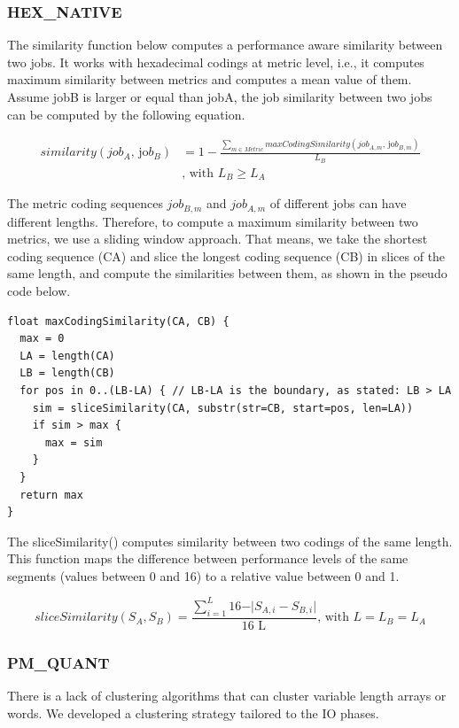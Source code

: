 \documentclass[]{llncs}
\begin{document}
\subsubsection{HEX\_NATIVE}
The similarity function below computes a performance aware similarity between two jobs.
It works with hexadecimal codings at metric level, i.e., it computes maximum similarity between metrics and computes a mean value of them.
Assume jobB is larger or equal than jobA, the job similarity between two jobs can be computed by the following equation.

\begin{align}
similarity \left( job_{A}\text{, jo}b_{B} \right) &= 1-\frac{ \sum _{m \in Metric}^{}maxCodingSimilarity \left( job_{A,m}\text{, jo}b_{B,m} \right) }{L_{B}}\\
&\text{, with }L_{B} \geq L_{A}
\end{align}

The metric coding sequences $job_{B,m}$ and $job_{A,m}$ of different jobs can have different lengths.
Therefore, to compute a maximum similarity between two metrics, we use a sliding window approach.
That means, we take the shortest coding sequence (CA) and slice the longest coding sequence (CB) in slices of the same length, and compute the similarities between them, as shown in the pseudo code below.

\begin{lstlisting}
float maxCodingSimilarity(CA, CB) { 
  max = 0
  LA = length(CA)
  LB = length(CB)
  for pos in 0..(LB-LA) { // LB-LA is the boundary, as stated: LB > LA
    sim = sliceSimilarity(CA, substr(str=CB, start=pos, len=LA))
    if sim > max {
      max = sim
    }
  }
  return max
}
\end{lstlisting}
The sliceSimilarity() computes similarity between two codings of the same length.
This function maps the difference between performance levels of the same segments (values between 0 and 16) to a relative value between 0 and 1.

\begin{equation}
sliceSimilarity \left( S_{A},S_{B} \right) =\frac{ \sum _{i=1}^{L_{}}16 - \vert S_{A,i}-S_{B,i} \vert }{\text{16 L}_{}}\text{, with }L=L_{B}=L_{A}
\end{equation}

\subsubsection{PM\_QUANT}
There is a lack of clustering algorithms that can cluster variable length arrays or words.
We developed a clustering strategy tailored to the IO phases.
\end{document}
